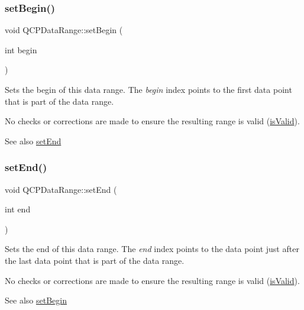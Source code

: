 \subsubsection{\texorpdfstring{set\+Begin()}{setBegin()}}
{\footnotesize\ttfamily void Q\+C\+P\+Data\+Range\+::set\+Begin (\begin{DoxyParamCaption}\item[{int}]{begin }\end{DoxyParamCaption})\hspace{0.3cm}{\ttfamily [inline]}}

Sets the begin of this data range. The {\itshape begin} index points to the first data point that is part of the data range.

No checks or corrections are made to ensure the resulting range is valid (\hyperlink{classQCPDataRange_aae53a37472212dca0a7939963e20dba0}{is\+Valid}).

\begin{DoxySeeAlso}{See also}
\hyperlink{classQCPDataRange_a277f1a9eafe70b9184d9c00b641ae5de}{set\+End} 
\end{DoxySeeAlso}
\mbox{\label{classQCPDataRange_a277f1a9eafe70b9184d9c00b641ae5de}} 
\subsubsection{\texorpdfstring{set\+End()}{setEnd()}}
{\footnotesize\ttfamily void Q\+C\+P\+Data\+Range\+::set\+End (\begin{DoxyParamCaption}\item[{int}]{end }\end{DoxyParamCaption})\hspace{0.3cm}{\ttfamily [inline]}}

Sets the end of this data range. The {\itshape end} index points to the data point just after the last data point that is part of the data range.

No checks or corrections are made to ensure the resulting range is valid (\hyperlink{classQCPDataRange_aae53a37472212dca0a7939963e20dba0}{is\+Valid}).

\begin{DoxySeeAlso}{See also}
\hyperlink{classQCPDataRange_a54ff59048e01e46ac4aefafc844626c6}{set\+Begin} 
\end{DoxySeeAlso}
\mbox{\label{classQCPDataRange_ac6af055e509d1b691c244954ff1c5887}} 
